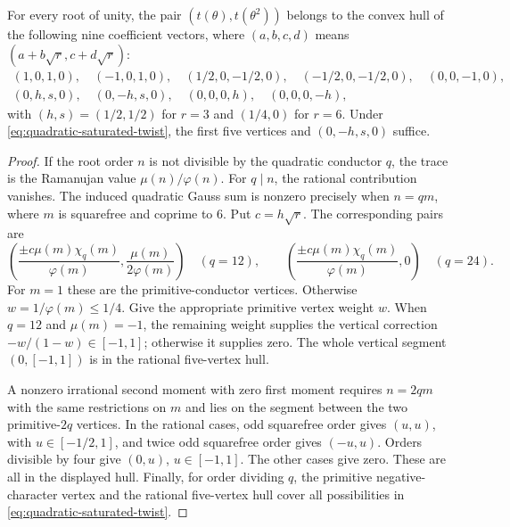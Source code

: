 \begin{lemma}\label{lem:quadratic-two-moment-hull}
For every root of unity, the pair $(t(\theta),t(\theta^2))$ belongs
to the convex hull of the following nine coefficient vectors, where
$(a,b,c,d)$ means $(a+b\sqrt r,c+d\sqrt r)$:
\begin{gather*}
 (1,0,1,0),\quad(-1,0,1,0),\quad
 (1/2,0,-1/2,0),\quad(-1/2,0,-1/2,0),\quad(0,0,-1,0),\\
 (0,h,s,0),\quad(0,-h,s,0),\quad
 (0,0,0,h),\quad(0,0,0,-h),
\end{gather*}
with $(h,s)=(1/2,1/2)$ for $r=3$ and $(1/4,0)$ for $r=6$.
Under \eqref{eq:quadratic-saturated-twist}, the first five vertices
and $(0,-h,s,0)$ suffice.
\end{lemma}
\begin{proof}
If the root order $n$ is not divisible by the quadratic conductor $q$,
the trace is the Ramanujan value $\mu(n)/\varphi(n)$. For $q\mid n$,
the rational contribution vanishes. The induced quadratic Gauss sum
is nonzero precisely when $n=qm$, where $m$ is squarefree and coprime
to $6$. Put $c=h\sqrt r$. The corresponding pairs are
\[
 \left(\frac{\pm c\mu(m)\chi_q(m)}{\varphi(m)},
                    \frac{\mu(m)}{2\varphi(m)}\right)
 \quad(q=12),\qquad
 \left(\frac{\pm c\mu(m)\chi_q(m)}{\varphi(m)},0\right)
 \quad(q=24).
\]
For $m=1$ these are the primitive-conductor vertices. Otherwise
$w=1/\varphi(m)\leq1/4$. Give the appropriate primitive vertex weight
$w$. When $q=12$ and $\mu(m)=-1$, the remaining weight supplies
the vertical correction $-w/(1-w)\in[-1,1]$; otherwise it supplies
zero. The whole vertical segment $(0,[-1,1])$ is in the rational
five-vertex hull.

A nonzero irrational second moment with zero first moment requires
$n=2qm$ with the same restrictions on $m$ and lies on the segment
between the two primitive-$2q$ vertices. In the rational cases, odd
squarefree order gives $(u,u)$, with $u\in[-1/2,1]$, and twice odd
squarefree order gives $(-u,u)$. Orders divisible by four give
$(0,u)$, $u\in[-1,1]$. The other cases give zero. These are all
in the displayed hull. Finally, for order dividing $q$, the primitive
negative-character vertex and the rational five-vertex hull cover
all possibilities in \eqref{eq:quadratic-saturated-twist}.
\end{proof}

